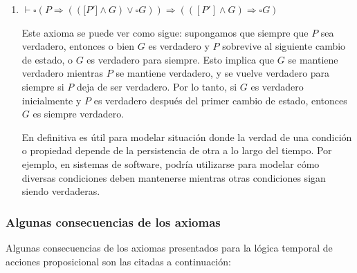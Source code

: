 \begin{enumerate}
    \item $ \vdash \square( P \Rightarrow ((\lbrack P' \rbrack \land G) \lor \square G )) \Rightarrow (([P'] \land G) \Rightarrow \square G)$

    Este axioma se puede ver como sigue: supongamos que siempre que $P$ sea verdadero, entonces o bien $G$ es verdadero y $P$ sobrevive al siguiente cambio de estado, o $G$ es verdadero para siempre. Esto implica que $G$ se mantiene verdadero mientras $P$ se mantiene verdadero, y se vuelve verdadero para siempre si $P$ deja de ser verdadero. Por lo tanto, si $G$ es verdadero inicialmente y $P$ es verdadero después del primer cambio de estado, entonces $G$ es siempre verdadero. 
    
    En definitiva es útil para modelar situación donde la verdad de una condición o propiedad depende de la persistencia de otra a lo largo del tiempo. Por ejemplo, en sistemas de software, podría utilizarse para modelar cómo diversas condiciones deben mantenerse mientras otras condiciones sigan siendo verdaderas.
\end{enumerate}

\subsubsection{Algunas consecuencias de los axiomas}\label{subsubsection:TLAconseq}
Algunas consecuencias de los axiomas presentados para la lógica temporal de acciones proposicional son las citadas a continuación:

